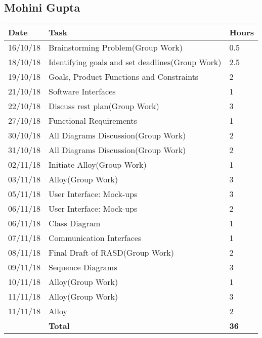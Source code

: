 \subsection{Mohini Gupta}
\begin{table}[H]
	\centering
    \begin{tabular}{|l|l|l|}
    \hline
     \textbf{Date} & \textbf{Task} & \textbf{Hours}\\
    \hline
    16/10/18 &	Brainstorming Problem(Group Work) &	0.5\\
\hline
18/10/18 &	Identifying goals and set deadlines(Group Work) &	2.5\\
\hline
19/10/18 &	Goals, Product Functions and Constraints &	2\\
\hline
21/10/18 &	Software Interfaces &	1\\
\hline
22/10/18 &	Discuss rest plan(Group Work) &	3\\
\hline
27/10/18 &	Functional Requirements &	1\\
\hline
30/10/18 &	All Diagrams Discussion(Group Work) &	2\\
\hline
31/10/18 &	All Diagrams Discussion(Group Work) &	2\\
\hline
02/11/18 &	Initiate Alloy(Group Work) &	1\\
\hline
03/11/18 &	Alloy(Group Work) &	3\\
\hline
05/11/18 &	User Interface: Mock-ups &	3\\
\hline
06/11/18 &	User Interface: Mock-ups &	2\\
\hline
06/11/18 &	Class Diagram &	1\\
\hline
07/11/18 &	Communication Interfaces &	1\\
\hline
08/11/18 &	Final Draft of RASD(Group Work) &	2\\
\hline
09/11/18 &	Sequence Diagrams &	3\\
\hline
10/11/18 &	Alloy(Group Work) &	1\\
\hline
11/11/18 &	Alloy(Group Work) &	3\\
\hline
11/11/18 &	Alloy &	2\\
    \hline
	& \textbf{Total}	& \textbf{36}\\   
    \hline
    \end{tabular}
\end{table}
